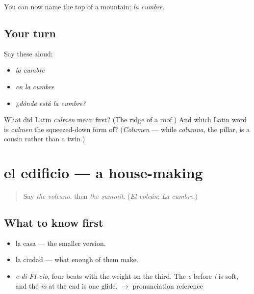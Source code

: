 \begin{grammarlens}[title={What you've built}]
You can now name the top of a mountain: \emph{la cumbre}.
\end{grammarlens}

\subsection*{Your turn}
Say these aloud:

\begin{itemize}
\raggedright
  \item \emph{la cumbre}
  \item \emph{en la cumbre}
  \item \emph{¿dónde está la cumbre?}
\end{itemize}

\begin{tcolorbox}[breakable,colback=teal!4,colframe=teal!35!black,title={Before you move on}]
What did Latin \emph{culmen} mean first? (The ridge of a roof.) And which Latin word is \emph{culmen} the squeezed-down form of? (\emph{Columen} — while \emph{columna}, the pillar, is a cousin rather than a twin.)
\end{tcolorbox}
\section[el edificio]{el edificio — a house-making}

\label{lesson:ES-C378-edificio}



\begin{quote}
Say \emph{the volcano}, then \emph{the summit}. (\emph{El volcán}; \emph{La cumbre}.)
\end{quote}

\subsection*{What to know first}
\begin{itemize}
\raggedright
  \item la casa — the smaller version.
  \item la ciudad — what enough of them make.
\end{itemize}

\begin{sounds}
\begin{itemize}
\raggedright
  \item \emph{e-di-FI-cio}, four beats with the weight on the third. The \emph{c} before \emph{i} is soft, and the \emph{io} at the end is one glide. $\to$ pronunciation reference
\end{itemize}
\end{sounds}


